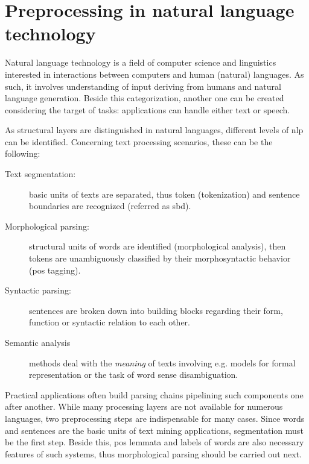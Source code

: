 \section{Preprocessing in natural language technology}



Natural language technology is a field of computer science and linguistics interested in interactions between computers and human (natural) languages. 
As such, it involves understanding of input deriving from humans and natural language generation. 
Beside this categorization, another one can be created considering the target of tasks: applications can handle either text or speech.

As structural layers are distinguished in natural languages, different levels of \gls{nlp} can be identified.
Concerning text processing scenarios, these can be the following:
\begin{description}
\item[Text segmentation:] basic units of texts are separated, thus token (tokenization) and sentence boundaries are recognized (referred as \gls{sbd}).
\item[Morphological parsing:] structural units of words are identified (morphological analysis), then tokens are unambiguously classified by their morphosyntactic behavior (\acrshort{pos} tagging).
\item[Syntactic parsing:] sentences are broken down into building blocks regarding their form, function or syntactic relation to each other.
\item[Semantic analysis] methods deal with the \emph{meaning} of texts involving e.g. models for formal representation or the task of word sense disambiguation.
\end{description}

Practical applications often build parsing chains pipelining such components one after another. 
While many processing layers are not available for numerous languages, two preprocessing steps are indispensable for many cases.
Since words and sentences are the basic units of text mining applications, segmentation must be the first step.
Beside this, \acrshort{pos} lemmata and labels of words are also necessary features of such systems, thus morphological parsing should be carried out next.

